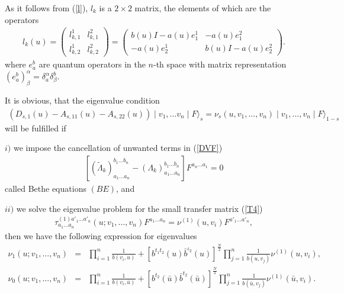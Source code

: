 \documentclass[a4paper,12pt]{article}
\newcommand{\nn}{\nonumber}
\begin{document}
As it follows from (\ref{l}), $l_{k}$ is a $2\times 2$ matrix, the
elements of which are the operators 
\begin{eqnarray}
\label{l1}
l_{k}(u)=\left(
\begin{array}{ll}
l_{k,1}^{1}&l_{k,1}^{2}\\
l_{k,2}^{1}&l_{k,2}^{2}
\end{array}
\right)=\left(
\begin{array}{ll} 
b(u)I-a(u)e_{1}^{1}&-a(u)e_{1}^{2}\\
-a(u)e_{2}^{1}&b(u)I-a(u)e_{2}^{2}
\end{array}
\right).
\end{eqnarray}
where $e_{a}^{b}$ are quantum operators in the $n$-th space with matrix 
representation $(e_{a}^{b})_{\beta}^{\alpha}=\delta_{a}^{\alpha}
\delta_{\beta}^{b}.$

It is obvious, that the eigenvalue condition 
\begin{eqnarray}
\label{nu}
(D_{s,1}(u)-A_{s,11}(u)-A_{s,22}(u))\mid v_{1},...v_{n}\mid F\rangle_{s}=
\nu_{s}(u,v_{1},...,v_{n})\mid v_{1},...,v_{n}\mid F\rangle_{1-s}\;\;\;
\end{eqnarray}
will be fulfilled if 

$i)$ we impose the cancellation of unwanted terms in (\ref{DVF})
\begin{eqnarray}
\label{i}
[(\tilde{\Lambda}_{k})_{a_{1}...a_{n}}^{b_{1}...b_{n}}-
({\Lambda}_{k})_{a_{1}...a_{n}}^{b_{1}...b_{n}}]F^{a_{n}...a_{1}}=0
\end{eqnarray}
called Bethe equations $(BE)$, and

$ii)$ we solve the eigenvalue problem for the small transfer matrix (\ref{T4})
\begin{eqnarray}
\label{ii}
\tau_{a_{1}...a_{n}}^{(1)a'_{1}...a'_{n}}(u;v_{1},...,v_{n})F^{a_{1}...a_{n}}
=\nu^{(1)}(u,v_{i})F^{a'_{1}...a'_{n}},
\end{eqnarray}
then we have the following expression for eigenvalues 
\begin{eqnarray}
\label{nu2}
\nu_{1}(u;v_{1},...,v_{n})&=&\prod_{i=1}^{n}\frac{1}{b(v_{i},u)}+
[b^{t_{1}t_{2}}(u)\bar{b}^{\iota_2}(u)]^{\frac{N}{2}} \prod_{j=1}^{n}
\frac{1}{b(u,v_{j})}\nu^{(1)}(u,v_{i}),\nn\\ 
\nu_0(u;v_{1},...,v_{n})&=&\prod_{i=1}^{n}\frac{1}{b(v_{i},\bar{u})}+
[b^{t_{2}}(\bar{u})\bar{b}^{t_{2}}(\bar{u})]^{\frac{N}{2}}\prod_{j=1}^{n}
\frac{1}{b(\bar{u},v_{j})}\nu^{(1)}(\bar{u},v_{i}).
\end{eqnarray}
\end{document}
